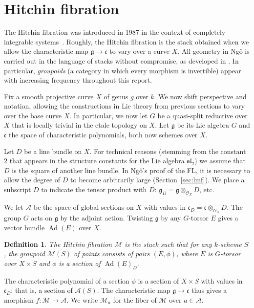 \documentclass[brochure,english,12pt]{bourbaki}
\newtheorem{definition}[equation]{Definition}
\def\op#1{{\operatorname{#1}}}
\def\sl{\mathfrak{sl}}
\def\g{\mathfrak{g}}
\def\cc{\mathfrak{c}}
\def\A{{\mathcal A}}
\def\M{{\mathcal M}}
\def\O{{\mathcal O}}
\begin{document}
\section{Hitchin fibration}

The Hitchin fibration was introduced in 1987 in the context of
completely integrable systems~\cite{Hitchin:87}.  Roughly, the Hitchin
fibration is the stack obtained when we allow the characteristic map
$\g\to\cc$ to vary over a curve $X$.  All geometry in Ng\^o is carried
out in the language of stacks without compromise, as developed in
\cite{LMB:2000}.  In particular, {\it groupoids} (a category in which
every morphism is invertible) appear with increasing frequency throughout this report.

Fix a smooth projective curve $X$ of genus $g$ over $k$.  We now shift
perspective and notation, allowing the constructions in Lie theory
from previous sections to vary over the base curve $X$.  In
particular, we now let $G$ be a quasi-split reductive over $X$ that is
locally trivial in the etale topology on $X$.  Let $\g$ be its Lie
algebra $G$ and $\cc$ the space of characteristic polynomials, both now schemes over $X$.

Let $D$ be a line bundle on $X$. For technical reasons (stemming from
the constant $2$ that appears in the structure constants for the Lie
algebra $\sl_2$) we assume that $D$ is the square of another line
bundle.  In Ng\^o's proof of the FL, it is necessary to allow the
degree of $D$ to become arbitrarily large (Section~\ref{sec:lmf}).  We
place a subscript $D$ to indicate the tensor product with $D$: $\g_D =
\g\otimes_{\O_X}\!\!D$, etc.

We let $\A$ be the space of global sections on $X$ with values in
$\cc_D=\cc\otimes_{\O_X}\!\!D$.  The group $G$ acts on $\g$ by the
adjoint action.  Twisting $\g$ by any $G$-torsor $E$ gives a
vector bundle $\op{Ad}(E)$ over $X$.

\begin{definition}
The Hitchin fibration $\M$ is the stack
such that for any $k$-scheme $S$, the groupoid $\M(S)$ of points consists
of pairs $(E,\phi)$, where $E$ is $G$-torsor over $X\times S$ and $\phi$ is a section of
$\op{Ad}(E)_D$.
\end{definition}

The characteristic polynomial of a section $\phi$ is a section of
$X\times S$ with values in $\cc_D$; that is, a section of $\A(S)$.
The characteristic map $\g\to\cc$ thus gives a morphism $f:\M\to\A$.
We write $\M_a$ for the fiber of $\M$ over $a\in \A$.
\end{document}
